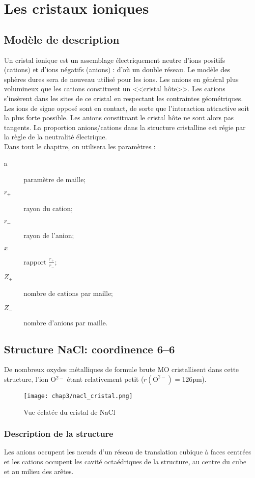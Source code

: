 \chapter{Les cristaux ioniques}
\section{Modèle de description}
Un cristal ionique est un assemblage électriquement neutre d'ions positifs (cations)
et d'ions négatifs (anions) : d'où un double réseau. Le modèle des sphères dures sera
de nouveau utilisé pour les ions.
Les anions en général plus volumineux que les cations constituent un <<cristal hôte>>.
Les cations s’insèrent dans les sites de ce cristal en respectant les contraintes 
géométriques. Les ions de signe opposé sont en contact, de sorte que l'interaction attractive
soit la plus forte possible. Les anions constituant le cristal hôte ne sont alors 
pas tangents. La proportion anions/cations dans la structure cristalline est régie 
par la règle de la neutralité électrique.\\
Dans tout le chapitre, on utilisera les paramètres :
\begin{description}
    \item[a] paramètre de maille;
    \item[$r_+$] rayon du cation;
    \item[$r_-$] rayon de l'anion;
    \item[$x$] rapport $\frac{r_+}{r_-}$;
    \item[$Z_+$] nombre de cations par maille;
    \item[$Z_-$] nombre d'anions par maille.
\end{description}

\section{Structure NaCl: coordinence 6\---6}
De nombreux oxydes métalliques de formule brute MO cristallisent dans cette
structure, l'ion O$^{2-}$ étant relativement petit ($r(\text{O}^{2-}) = 126$pm).

\begin{figure}
    \centering
    \texttt{[image: chap3/nacl\_cristal.png]}
    \caption{Vue éclatée du cristal de NaCl}\label{fig:3_nacl_cristal}
\end{figure}
\subsection{Description de la structure}
Les anions occupent les n\oe uds d'un réseau de translation cubique à faces
centrées et les cations occupent les cavité octaédriques de la structure,
au centre du cube et au milieu des arêtes.\\


